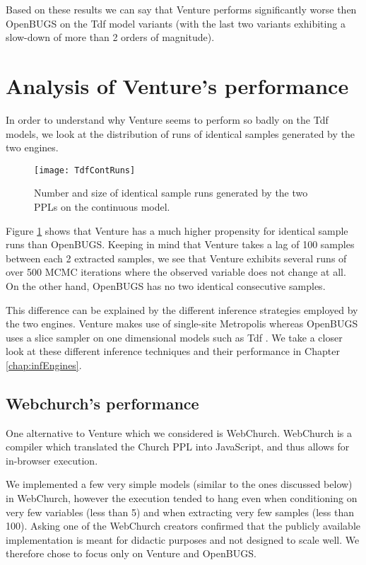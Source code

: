 Based on these results we can say that Venture performs significantly worse then OpenBUGS on the Tdf model variants (with the last two variants exhibiting a slow-down of more than 2 orders of magnitude).

\section{Analysis of Venture's performance}

In order to understand why Venture seems to perform so badly on the Tdf models, we look at the distribution of runs of identical samples generated by the two engines.

\begin{figure}[h]
    \centering
    \texttt{[image: TdfContRuns]}
    \caption{Number and size of identical sample runs generated by the two PPLs on the continuous model.}
    \label{fig:tdfContRun}
\end{figure}

Figure \ref{fig:tdfContRun} shows that Venture has a much higher propensity for identical sample runs than OpenBUGS. Keeping in mind that Venture takes a lag of 100 samples between each 2 extracted samples, we see that Venture exhibits several runs of over 500 MCMC iterations where the observed variable does not change at all. On the other hand, OpenBUGS has no two identical consecutive samples.

This difference can be explained by the different inference strategies employed by the two engines. Venture makes use of single-site Metropolis whereas OpenBUGS uses a slice sampler on one dimensional models such as Tdf . We take a closer look at these different inference techniques and their performance in Chapter \ref{chap:infEngines}.


\subsection{Webchurch's performance}
One alternative to Venture which we considered is WebChurch. WebChurch is a compiler which translated the Church PPL into JavaScript, and thus allows for in-browser execution.

We implemented a few very simple models (similar to the ones discussed below) in WebChurch, however the execution tended to hang even when conditioning on very few variables (less than 5) and when extracting very few samples (less than 100). Asking one of the WebChurch creators confirmed that the publicly available implementation is meant for didactic purposes and not designed to scale well. We therefore chose to focus only on Venture and OpenBUGS.
